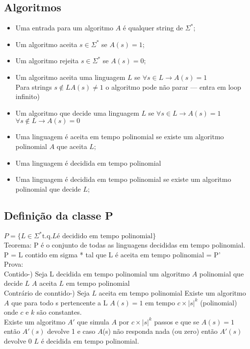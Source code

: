 \documentclass[a4paper,oneside,article,table]{article}
\begin{document}
\subsection{Algoritmos}
\begin{itemize}
    \item Uma entrada para um algoritmo $A$ é qualquer string de $\Sigma^*$;
    \item Um algoritmo aceita $s\in\Sigma^*$ se $A(s)=1$;
    \item Um algoritmo rejeita $s\in\Sigma^*$ se $A(s)=0$;
    \item Um algoritmo aceita uma linguagem $L$ se $\forall s \in L \rightarrow A(s)=1$\\
        Para strings $s \notin L A(s) \neq 1$ o algoritmo pode não parar --- entra em loop infinito)\\
    \item Um algoritmo que decide uma linguagem $L$ se $\forall s \in L \rightarrow A(s) = 1$\\
        $\forall s \notin L \rightarrow A(s) = 0$
    \item Uma linguagem é aceita em tempo polinomial se existe um algoritmo polinomial $A$ que aceita $L$;\\\item Uma linguagem é decidida em tempo polinomial 
    \item Uma linguagem é decidida em tempo polinomial se existe um algoritmo polinomial que decide $L$;

\end{itemize}

    \subsection{Definição da classe P}

        $P = \{ L \in \Sigma^* \text{t.q.} L \text{é decidido em tempo polinomial} \}$\\
        Teorema: P é o conjunto de todas as linguagens decididas em tempo polinomial.\\
        P = {L contido em sigma * tal que L é aceita em tempo polinomial} = P'\\
        Prova:\\
        Contido-) Seja L decidida em tempo polinomial \rightarrow um algoritmo $A$ polinomial que decide $L$ \rightarrow $A$ aceita $L$ em tempo polinomial\\
        Contrário de conntido-) Seja $L$ aceita em tempo polinomial \arrowright Existe um algoritmo $A$ que para todo s pertencente a L $A(s) = 1$ em tempo $c\times|s|^k$ (polinomial) onde $c$ e $k$ são constantes.\\
        Existe um algoritmo $A'$ que simula $A$ por $c\times|s|^k$ passos e que se $A(s)=1$ então $A'(s)$ devolve 1 e caso $A$(s) não responda nada (ou zero) então $A'(s)$ devolve $0$ \rightarrow $L$ é decidida em tempo polinomial.
\end{document}
